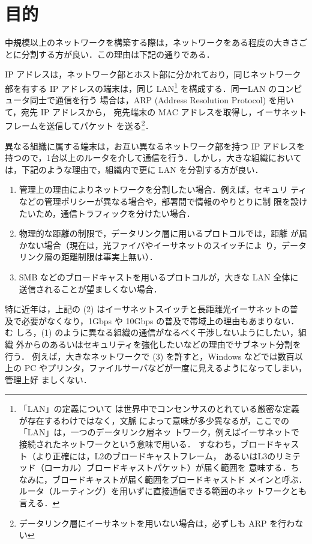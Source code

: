 \section{目的}

中規模以上のネットワークを構築する際は，ネットワークをある程度の大きさご
とに分割する方が良い．この理由は下記の通りである．

IP アドレスは，ネットワーク部とホスト部に分かれており，同じネットワーク
部を有する IP アドレスの端末は，同じ LAN\footnote{「LAN」の定義について
は世界中でコンセンサスのとれている厳密な定義が存在するわけではなく，文脈
によって意味が多少異なるが，ここでの「LAN」は，一つのデータリンク層ネッ
トワーク，例えばイーサネットで接続されたネットワークという意味で用いる．
すなわち，ブロードキャスト（より正確には，L2のブロードキャストフレーム，
あるいはL3のリミテッド（ローカル）ブロードキャストパケット）が届く範囲を
意味する．ちなみに，ブロードキャストが届く範囲をブロードキャストド
メインと呼ぶ．ルータ（ルーティング）を用いずに直接通信できる範囲のネッ
トワークとも言える．} を構成する．同一LAN のコンピュータ同士で通信を行う
場合は，ARP (Address Resolution Protocol) を用いて，宛先 IP アドレスから，
宛先端末の MAC アドレスを取得し，イーサネットフレームを送信してパケット
を送る\footnote{データリンク層にイーサネットを用いない場合は，必ずしも 
ARP を行わない}．

異なる組織に属する端末は，お互い異なるネットワーク部を持つ IP アドレスを
持つので，1台以上のルータを介して通信を行う．しかし，大きな組織において
は，下記のような理由で，組織内で更に LAN を分割する方が良い．
\begin{enumerate}
 \item 管理上の理由によりネットワークを分割したい場合．例えば，セキュリ
       ティなどの管理ポリシーが異なる場合や，部署間で情報のやりとりに制
       限を設けたいため，通信トラフィックを分けたい場合．
 \item 物理的な距離の制限で，データリンク層に用いるプロトコルでは，距離
       が届かない場合（現在は，光ファイバやイーサネットのスイッチによ
       り，データリンク層の距離制限は事実上無い）．
 \item SMB などのブロードキャストを用いるプロトコルが，大きな LAN 全体に
       送信されることが望ましくない場合．
\end{enumerate}

特に近年は，上記の (2) はイーサネットスイッチと長距離光イーサネットの普
及で必要がなくなり，1Gbps や 10Gbps の普及で帯域上の理由もあまりない．む
しろ，(1) のように異なる組織の通信がなるべく干渉しないようにしたい，組織
外からのあるいはセキュリティを強化したいなどの理由でサブネット分割を行う．
例えば，大きなネットワークで (3) を許すと，Windows などでは数百以上の PC 
やプリンタ，ファイルサーバなどが一度に見えるようになってしまい，管理上好
ましくない．


